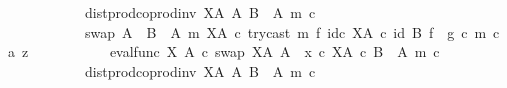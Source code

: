 \begin{isabellebody}
\ \ \ \ \ \ \ \ \ \ \ \ dist{\isacharunderscore}{\kern0pt}prod{\isacharunderscore}{\kern0pt}coprod{\isacharunderscore}{\kern0pt}inv\ {\isacharparenleft}{\kern0pt}X\isactrlbsup A\isactrlesup {\isacharparenright}{\kern0pt}\ A\ {\isacharparenleft}{\kern0pt}B\ {\isasymsetminus}\ {\isacharparenleft}{\kern0pt}A{\isacharcomma}{\kern0pt}\ m{\isacharparenright}{\kern0pt}{\isacharparenright}{\kern0pt}\ {\isasymcirc}\isactrlsub c\isanewline
\ \ \ \ \ \ \ \ \ \ \ \ swap\ {\isacharparenleft}{\kern0pt}A\ {\isasymCoprod}\ {\isacharparenleft}{\kern0pt}B\ {\isasymsetminus}\ {\isacharparenleft}{\kern0pt}A{\isacharcomma}{\kern0pt}\ m{\isacharparenright}{\kern0pt}{\isacharparenright}{\kern0pt}{\isacharparenright}{\kern0pt}\ {\isacharparenleft}{\kern0pt}X\isactrlbsup A\isactrlesup {\isacharparenright}{\kern0pt}\ {\isasymcirc}\isactrlsub c\ try{\isacharunderscore}{\kern0pt}cast\ m\ {\isasymtimes}\isactrlsub f\ id\isactrlsub c\ {\isacharparenleft}{\kern0pt}X\isactrlbsup A\isactrlesup {\isacharparenright}{\kern0pt}{\isacharparenright}{\kern0pt}\ {\isasymcirc}\isactrlsub c\ {\isacharparenleft}{\kern0pt}id\ B\ {\isasymtimes}\isactrlsub f\ \ g{\isacharparenright}{\kern0pt}{\isacharparenright}{\kern0pt}\ {\isasymcirc}\isactrlsub c\ {\isasymlangle}m\ {\isasymcirc}\isactrlsub c\ a{\isacharcomma}{\kern0pt}\ z{\isasymrangle}\isanewline
\ \ \ \ \ \ \ \ \ \ {\isacharequal}{\kern0pt}\ {\isacharparenleft}{\kern0pt}{\isacharparenleft}{\kern0pt}{\isacharparenleft}{\kern0pt}eval{\isacharunderscore}{\kern0pt}func\ X\ A\ {\isasymcirc}\isactrlsub c\ swap\ {\isacharparenleft}{\kern0pt}X\isactrlbsup A\isactrlesup {\isacharparenright}{\kern0pt}\ A{\isacharparenright}{\kern0pt}\ {\isasymamalg}\ {\isacharparenleft}{\kern0pt}x\ {\isasymcirc}\isactrlsub c\ {\isasymbeta}\isactrlbsub X\isactrlbsup A\isactrlesup \ {\isasymtimes}\isactrlsub c\ {\isacharparenleft}{\kern0pt}B\ {\isasymsetminus}\ {\isacharparenleft}{\kern0pt}A{\isacharcomma}{\kern0pt}\ m{\isacharparenright}{\kern0pt}{\isacharparenright}{\kern0pt}\isactrlesub {\isacharparenright}{\kern0pt}\ {\isasymcirc}\isactrlsub c\isanewline
\ \ \ \ \ \ \ \ \ \ \ \ dist{\isacharunderscore}{\kern0pt}prod{\isacharunderscore}{\kern0pt}coprod{\isacharunderscore}{\kern0pt}inv\ {\isacharparenleft}{\kern0pt}X\isactrlbsup A\isactrlesup {\isacharparenright}{\kern0pt}\ A\ {\isacharparenleft}{\kern0pt}B\ {\isasymsetminus}\ {\isacharparenleft}{\kern0pt}A{\isacharcomma}{\kern0pt}\ m{\isacharparenright}{\kern0pt}{\isacharparenright}{\kern0pt}\ {\isasymcirc}\isactrlsub c\isanewline

\end{isabellebody}
